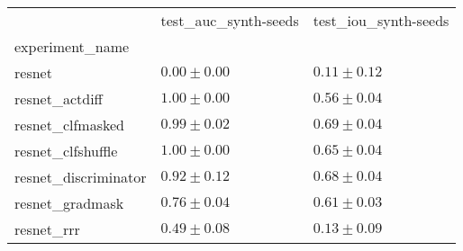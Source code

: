 \begin{tabular}{lll}
\toprule
{} & test_auc_synth-seeds & test_iou_synth-seeds \\
experiment_name      &                      &                      \\
\midrule
resnet               &        $0.00\pm0.00$ &        $0.11\pm0.12$ \\
resnet_actdiff       &        $1.00\pm0.00$ &        $0.56\pm0.04$ \\
resnet_clfmasked     &        $0.99\pm0.02$ &        $0.69\pm0.04$ \\
resnet_clfshuffle    &        $1.00\pm0.00$ &        $0.65\pm0.04$ \\
resnet_discriminator &        $0.92\pm0.12$ &        $0.68\pm0.04$ \\
resnet_gradmask      &        $0.76\pm0.04$ &        $0.61\pm0.03$ \\
resnet_rrr           &        $0.49\pm0.08$ &        $0.13\pm0.09$ \\
\bottomrule
\end{tabular}
